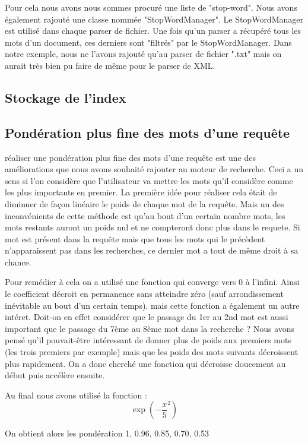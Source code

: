 \documentclass[a4paper,12pt]{article}
\begin{document}
Pour cela nous avons nous sommes procuré une liste de "stop-word". Nous avons également rajouté une classe nommée "StopWordManager". Le StopWordManager est utilisé dans chaque parser de fichier. Une fois qu'un parser a récupéré tous les mots d'un document, ces derniers sont "filtrés" par le StopWordManager. Dans notre exemple, nous ne l'avons rajouté qu'au parser de fichier ".txt" mais on aurait très bien pu faire de même pour le parser de XML.

\subsection{Stockage de l'index}

\subsection{Pondération plus fine des mots d'une requête}

réaliser une pondération plus fine des mots d'une requête est une des améliorations que nous avons souhaité rajouter au moteur de recherche. Ceci a un sens si l'on
considère que l'utilisateur va mettre les mots qu'il considère comme les plus importants en premier. La première idée pour réaliser cela était de diminuer de façon linéaire le poids de chaque mot de la requête.
Mais un des inconvénients de cette méthode est qu'au bout d'un certain nombre mots, les mots restants auront un poids nul et ne compteront donc plus dans le requete. Si mot est présent dans la requête mais que tous les mots qui le précèdent n'apparaissent pas dans les recherches, ce dernier mot a tout de même droit à sa chance.

Pour remédier à cela on a utilisé une fonction qui converge vers 0 à l'infini. Ainsi le coefficient décroit en permanence sans atteindre zéro (sauf arrondissement inévitable au bout d'un certain temps).
mais cette fonction a également un autre intéret. Doit-on en effet considérer que le passage du 1er au 2nd mot est aussi important que le passage du 7ème au 8ème mot dans la recherche ? Nous avons pensé qu'il pouvait-être
intéressant de donner plus de poids aux premiers mots (les trois premiers par exemple) mais que les poids des mots suivants décroissent plus rapidement. On a donc cherché une fonction qui décroisse doucement au début puis accélère ensuite.

Au final nous avons utilisé la fonction : \[\exp(-\frac{x}{5}^{2})\]

On obtient alors les pondération 1, 0.96, 0.85, 0.70, 0.53
\end{document}
